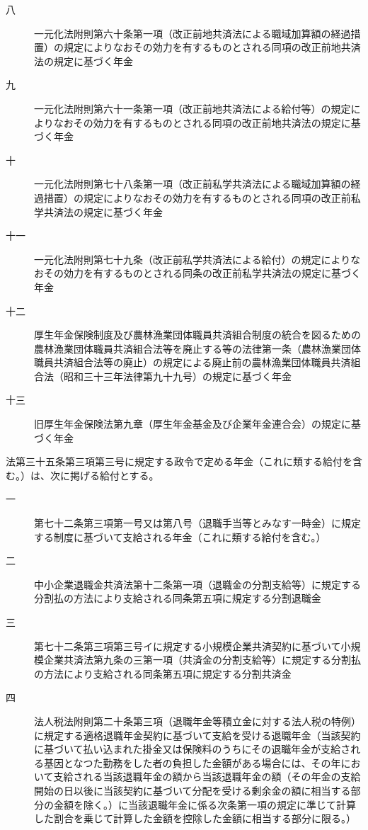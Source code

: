 \documentclass[twocolumn,a4j,10pt]{ltjtarticle}
\begin{document}
\begin{description}
\begin{description}
\item[八]一元化法附則第六十条第一項（改正前地共済法による職域加算額の経過措置）の規定によりなおその効力を有するものとされる同項の改正前地共済法の規定に基づく年金
\item[九]一元化法附則第六十一条第一項（改正前地共済法による給付等）の規定によりなおその効力を有するものとされる同項の改正前地共済法の規定に基づく年金
\item[十]一元化法附則第七十八条第一項（改正前私学共済法による職域加算額の経過措置）の規定によりなおその効力を有するものとされる同項の改正前私学共済法の規定に基づく年金
\item[十一]一元化法附則第七十九条（改正前私学共済法による給付）の規定によりなおその効力を有するものとされる同条の改正前私学共済法の規定に基づく年金
\item[十二]厚生年金保険制度及び農林漁業団体職員共済組合制度の統合を図るための農林漁業団体職員共済組合法等を廃止する等の法律第一条（農林漁業団体職員共済組合法等の廃止）の規定による廃止前の農林漁業団体職員共済組合法（昭和三十三年法律第九十九号）の規定に基づく年金
\item[十三]旧厚生年金保険法第九章（厚生年金基金及び企業年金連合会）の規定に基づく年金
\end{description}
\item[\rensuji{2}]法第三十五条第三項第三号に規定する政令で定める年金（これに類する給付を含む。）は、次に掲げる給付とする。
\begin{description}
\item[一]第七十二条第三項第一号又は第八号（退職手当等とみなす一時金）に規定する制度に基づいて支給される年金（これに類する給付を含む。）
\item[二]中小企業退職金共済法第十二条第一項（退職金の分割支給等）に規定する分割払の方法により支給される同条第五項に規定する分割退職金
\item[三]第七十二条第三項第三号イに規定する小規模企業共済契約に基づいて小規模企業共済法第九条の三第一項（共済金の分割支給等）に規定する分割払の方法により支給される同条第五項に規定する分割共済金
\item[四]法人税法附則第二十条第三項（退職年金等積立金に対する法人税の特例）に規定する適格退職年金契約に基づいて支給を受ける退職年金（当該契約に基づいて払い込まれた掛金又は保険料のうちにその退職年金が支給される基因となつた勤務をした者の負担した金額がある場合には、その年において支給される当該退職年金の額から当該退職年金の額（その年金の支給開始の日以後に当該契約に基づいて分配を受ける剰余金の額に相当する部分の金額を除く。）に当該退職年金に係る次条第一項の規定に準じて計算した割合を乗じて計算した金額を控除した金額に相当する部分に限る。）

\end{description}
\end{description}
\end{document}
